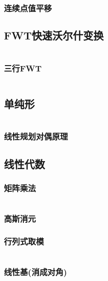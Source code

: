 \documentclass[a4paper, twoside]{article}
\begin{document}
\begin{multicols}{2}
				\subsubsection{连续点值平移}

			\subsection{FWT快速沃尔什变换}
				\inputminted{cpp}{../src/math/FWT.cpp}

				\subsubsection{三行FWT}
					\inputminted{cpp}{../src/math/fwt3.cpp}

			\subsection{单纯形}
				\inputminted{cpp}{../src/math/单纯形.cpp}

				\subsubsection{线性规划对偶原理}
					

			\subsection{线性代数}
				\subsubsection{矩阵乘法}
					\inputminted{cpp}{../src/math/矩阵乘法.cpp}

				\subsubsection{高斯消元}
					

				\subsubsection{行列式取模}
					\inputminted{cpp}{../src/math/行列式取模.cpp}



				\subsubsection{线性基(消成对角)}
					\inputminted{cpp}{../src/math/线性基.cpp}


\end{multicols}
\end{document}
